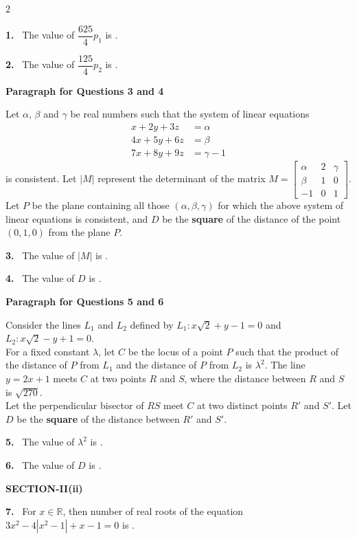 \documentclass[10pt]{extarticle}
\newcommand{\sect}[1]{\par\smallskip\noindent\textbf{#1}\par}
\newcommand{\qn}[1]{\par\smallskip\noindent\textbf{#1.}~}
\newcommand{\paraq}[2]{\par\smallskip\noindent\textbf{Paragraph for Questions #1 and #2}\par}
\begin{document}
\begin{multicols}{2}
\qn{1} The value of $\dfrac{625}{4}p_1$ is \underline{\hspace{3em}}.

\qn{2} The value of $\dfrac{125}{4}p_2$ is \underline{\hspace{3em}}.

\paraq{3}{4}
Let $\alpha$, $\beta$ and $\gamma$ be real numbers such that the system of linear equations
\begin{align*}
x+2y+3z&=\alpha\\
4x+5y+6z&=\beta\\
7x+8y+9z&=\gamma-1
\end{align*}
is consistent. Let $|M|$ represent the determinant of the matrix $M=\begin{bmatrix}\alpha&2&\gamma\\\beta&1&0\\-1&0&1\end{bmatrix}$.
Let $P$ be the plane containing all those $(\alpha,\beta,\gamma)$ for which the above system of linear equations is consistent, and $D$ be the \textbf{square} of the distance of the point $(0,1,0)$ from the plane $P$.

\qn{3} The value of $|M|$ is \underline{\hspace{3em}}.

\qn{4} The value of $D$ is \underline{\hspace{3em}}.

\paraq{5}{6}
Consider the lines $L_1$ and $L_2$ defined by $L_1:x\sqrt2+y-1=0$ and $L_2:x\sqrt2-y+1=0$.\\
For a fixed constant $\lambda$, let $C$ be the locus of a point $P$ such that the product of the distance of $P$ from $L_1$ and the distance of $P$ from $L_2$ is $\lambda^2$. The line $y=2x+1$ meets $C$ at two points $R$ and $S$, where the distance between $R$ and $S$ is $\sqrt{270}$.\\
Let the perpendicular bisector of $RS$ meet $C$ at two distinct points $R'$ and $S'$. Let $D$ be the \textbf{square} of the distance between $R'$ and $S'$.

\qn{5} The value of $\lambda^2$ is \underline{\hspace{3em}}.

\qn{6} The value of $D$ is \underline{\hspace{3em}}.

\sect{SECTION-II(ii)}
\qn{7} For $x\in\mathbb R$, then number of real roots of the equation $3x^2-4|x^2-1|+x-1=0$ is \underline{\hspace{3em}}.


\end{multicols}
\end{document}
